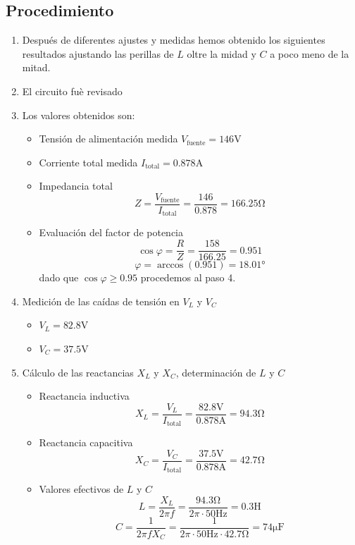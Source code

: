 \documentclass{article}
\begin{document}
\subsection{Procedimiento}
\begin{enumerate}
  \item Después de diferentes ajustes y medidas hemos obtenido los siguientes resultados ajustando las perillas de $L$ oltre la midad y $C$ a poco meno de la mitad.
  \item El circuito fuè revisado
  \item Los valores obtenidos son:
  \begin{itemize}
    \item Tensión de alimentación medida $V_{\text{fuente}} = 146 \si{\volt}$
    \item Corriente total medida $I_{\text{total}} = 0.878 \si{\ampere}$
    \item Impedancia total 
    \[
    Z = \frac{V_{\text{fuente}}}{I_{\text{total}}} = \frac{146}{0.878} = 166.25 \si{\ohm}
    \]
    \item Evaluación del factor de potencia
    \[
    \cos \varphi = \frac{R}{Z} = \frac{158}{166.25} = 0.951
    \]
    \[
    \varphi = \arccos(0.951) = 18.01 \si{\degree}
    \]
    dado que $\cos \varphi \geq 0.95$ procedemos al paso 4.
  \end{itemize}
  \item Medición de las caídas de tensión en $V_L$ y $V_C$
  \begin{itemize}
    \item $V_L = 82.8 \si{\volt}$
    \item $V_C = 37.5 \si{\volt}$
  \end{itemize}
  \item Cálculo de las reactancias $X_L$ y $X_C$, determinación de $L$ y $C$
  \begin{itemize}
    \item Reactancia inductiva
    \[
    X_L = \frac{V_L}{I_{\text{total}}} = \frac{82.8 \si{\volt}}{0.878\si{\ampere}} = 94.3 \si{\ohm}
    \]
    \item Reactancia capacitiva
    \[
    X_C = \frac{V_C}{I_{\text{total}}} = \frac{37.5\si{\volt}}{0.878\si{\ampere}} = 42.7 \si{\ohm}
    \]
    \item Valores efectivos de $L$ y $C$
    \[
    L = \frac{X_L}{2\pi f} = \frac{94.3\si{\ohm}}{2\pi \cdot 50\si{\hertz}} = 0.3 \si{\henry}
    \]
    \[
    C = \frac{1}{2\pi f X_C} = \frac{1}{2\pi \cdot 50 \si{\hertz} \cdot 42.7\si{\ohm}} = 74 \si{\micro\farad}
\]
\end{itemize}
\end{enumerate}
\end{document}

